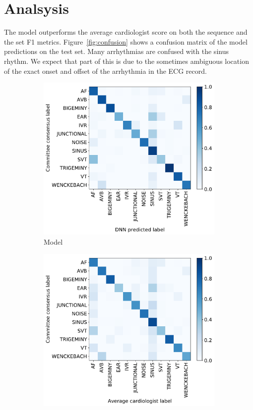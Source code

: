\section{Analsysis}

The model outperforms the average cardiologist score on both the sequence and
the set F1 metrics. Figure~\ref{fig:confusion} shows a confusion matrix of the
model predictions on the test set. Many arrhythmias are confused with the sinus
rhythm. We expect that part of this is due to the sometimes ambiguous location
of the exact onset and offset of the arrhythmia in the ECG record.

\begin{figure}
\begin{subfigure}{.5\textwidth}
  \centering
  \includegraphics[width=0.9\linewidth]{arrhythmias/figures/model_confusions.pdf}
  \caption{Model}
  \label{fig:arrhythmia:model_confusion}
\end{subfigure}
\begin{subfigure}{.5\textwidth}
  \centering
  \includegraphics[width=0.9\linewidth]{arrhythmias/figures/human_confusions.pdf}

\end{subfigure}
\end{figure}
